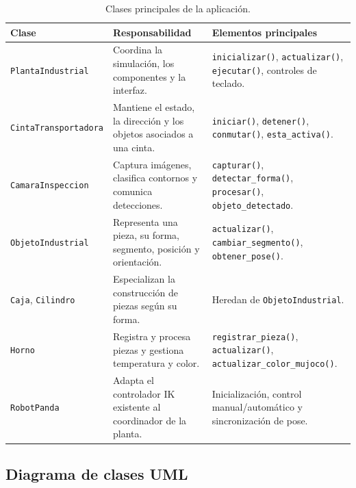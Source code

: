 \documentclass[12pt,a4paper]{article}
\begin{document}
\begin{table}[H]
    \centering
    \caption{Clases principales de la aplicación.}
    \label{tab:clases}
    \begin{tabularx}{\textwidth}{p{3.2cm}X X}
        \toprule
        \textbf{Clase} & \textbf{Responsabilidad} & \textbf{Elementos principales} \\
        \midrule
        \texttt{PlantaIndustrial} & Coordina la simulación, los componentes y la interfaz. & \texttt{inicializar()}, \texttt{actualizar()}, \texttt{ejecutar()}, controles de teclado. \\
        \texttt{CintaTransportadora} & Mantiene el estado, la dirección y los objetos asociados a una cinta. & \texttt{iniciar()}, \texttt{detener()}, \texttt{conmutar()}, \texttt{esta\_activa()}. \\
        \texttt{CamaraInspeccion} & Captura imágenes, clasifica contornos y comunica detecciones. & \texttt{capturar()}, \texttt{detectar\_forma()}, \texttt{procesar()}, \texttt{objeto\_detectado}. \\
        \texttt{ObjetoIndustrial} & Representa una pieza, su forma, segmento, posición y orientación. & \texttt{actualizar()}, \texttt{cambiar\_segmento()}, \texttt{obtener\_pose()}. \\
        \texttt{Caja}, \texttt{Cilindro} & Especializan la construcción de piezas según su forma. & Heredan de \texttt{ObjetoIndustrial}. \\
        \texttt{Horno} & Registra y procesa piezas y gestiona temperatura y color. & \texttt{registrar\_pieza()}, \texttt{actualizar()}, \texttt{actualizar\_color\_mujoco()}. \\
        \texttt{RobotPanda} & Adapta el controlador IK existente al coordinador de la planta. & Inicialización, control manual/automático y sincronización de pose. \\
        \bottomrule
    \end{tabularx}
\end{table}

\subsection{Diagrama de clases UML}
\end{document}

